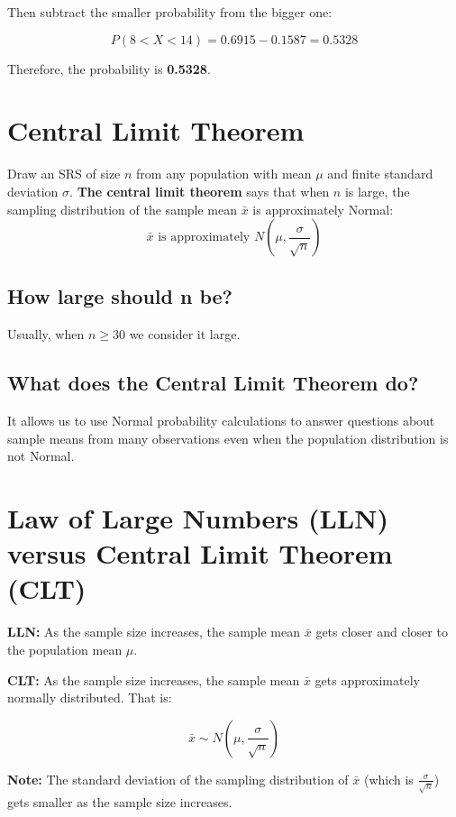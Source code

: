 Then subtract the smaller probability from the bigger one:

\[
P(8 < X < 14) = 0.6915 - 0.1587 = 0.5328
\]

\noindent Therefore, the probability is \textbf{0.5328}.

\section{Central Limit Theorem}
Draw an SRS of size $n$ from any population with mean $\mu$ and finite standard deviation $\sigma$. \textbf{The central limit theorem} says that when $n$ is large, the sampling distribution of the sample mean $\bar{x}$ is approximately Normal:
\[
\bar{x} \text{ is approximately } N\left(\mu, \frac{\sigma}{\sqrt{n}}\right)
\]


\subsection*{How large should n be?}
Usually, when $n \geq 30$ we consider it large.

\subsection*{What does the Central Limit Theorem do?}
It allows us to use Normal probability calculations to answer questions about sample means from many observations even when the population distribution is not Normal.

\section{Law of Large Numbers (LLN) versus Central Limit Theorem (CLT)}

\noindent \textbf{LLN:} As the sample size increases, the sample mean $\bar{x}$ gets closer and closer to the population mean $\mu$.

\vspace{0.2cm}

\noindent \textbf{CLT:} As the sample size increases, the sample mean $\bar{x}$ gets approximately normally distributed. That is:

\[
\bar{x} \sim N\left(\mu, \frac{\sigma}{\sqrt{n}}\right)
\]

\noindent \textbf{Note:} The standard deviation of the sampling distribution of $\bar{x}$ (which is $\frac{\sigma}{\sqrt{n}}$) gets smaller as the sample size increases.
